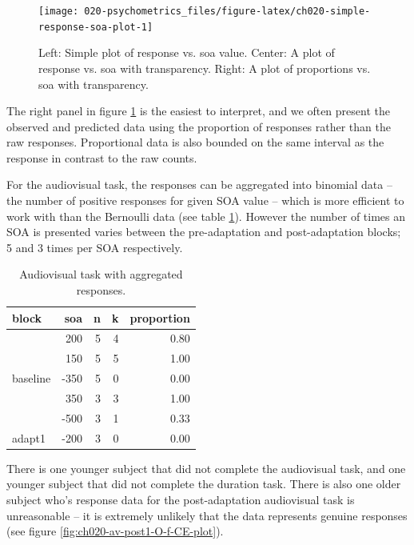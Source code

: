 \documentclass[11pt, oneside, openany]{scrbook}
\begin{document}
\begin{figure}

{\centering \texttt{[image: 020-psychometrics\_files/figure-latex/ch020-simple-response-soa-plot-1]} 

}

\caption{Left: Simple plot of response vs. soa value. Center: A plot of response vs. soa with transparency. Right: A plot of proportions vs. soa with transparency.}\label{fig:ch020-simple-response-soa-plot}
\end{figure}

The right panel in figure \ref{fig:ch020-simple-response-soa-plot} is the easiest to interpret, and we often present the observed and predicted data using the proportion of responses rather than the raw responses. Proportional data is also bounded on the same interval as the response in contrast to the raw counts.

For the audiovisual task, the responses can be aggregated into binomial data -- the number of positive responses for given SOA value -- which is more efficient to work with than the Bernoulli data (see table \ref{tab:ch020-av-bin-sample}). However the number of times an SOA is presented varies between the pre-adaptation and post-adaptation blocks; 5 and 3 times per SOA respectively.

\begin{table}[!h]
\centering
\caption{\label{tab:ch020-av-bin-sample}Audiovisual task with aggregated responses.}
\centering
\begin{tabular}[t]{lrrrr}
\toprule
block & soa & n & k & proportion\\
\midrule
 & 200 & 5 & 4 & 0.80\\
\cmidrule{2-5}
 & 150 & 5 & 5 & 1.00\\
\cmidrule{2-5}
\multirow[t]{-3}{*}{\raggedright\arraybackslash baseline} & -350 & 5 & 0 & 0.00\\
\cmidrule{1-5}
 & 350 & 3 & 3 & 1.00\\
\cmidrule{2-5}
 & -500 & 3 & 1 & 0.33\\
\cmidrule{2-5}
\multirow[t]{-3}{*}{\raggedright\arraybackslash adapt1} & -200 & 3 & 0 & 0.00\\
\bottomrule
\end{tabular}
\end{table}

There is one younger subject that did not complete the audiovisual task, and one younger subject that did not complete the duration task. There is also one older subject who's response data for the post-adaptation audiovisual task is unreasonable -- it is extremely unlikely that the data represents genuine responses (see figure \ref{fig:ch020-av-post1-O-f-CE-plot}).
\end{document}
